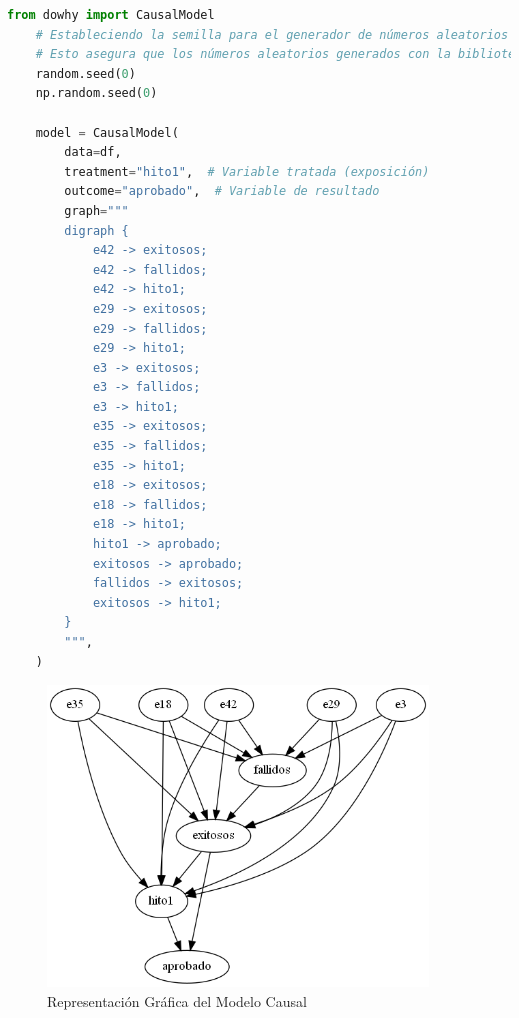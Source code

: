 \begin{lstlisting}[language=Python, caption=Construcción del Modelo Causal para hito1, label=lst:model_causalHito1]
    from dowhy import CausalModel
    # Estableciendo la semilla para el generador de números aleatorios de la biblioteca 'random' en Python.
    # Esto asegura que los números aleatorios generados con la biblioteca 'random' serán reproducibles en cada ejecución.
    random.seed(0)
    np.random.seed(0)
    
    model = CausalModel(
        data=df,
        treatment="hito1",  # Variable tratada (exposición)
        outcome="aprobado",  # Variable de resultado
        graph="""
        digraph {
            e42 -> exitosos;
            e42 -> fallidos;
            e42 -> hito1;
            e29 -> exitosos;
            e29 -> fallidos;
            e29 -> hito1;
            e3 -> exitosos;
            e3 -> fallidos;
            e3 -> hito1;
            e35 -> exitosos;
            e35 -> fallidos;
            e35 -> hito1;
            e18 -> exitosos;
            e18 -> fallidos;
            e18 -> hito1;
            hito1 -> aprobado;
            exitosos -> aprobado;
            fallidos -> exitosos;
            exitosos -> hito1;
        }
        """,
    )
\end{lstlisting}


\begin{figure}[H]
        \centering
        \includegraphics[width=0.9\textwidth]{img/causalidad/graph_causal_model_hito1.png}
        \caption{Representación Gráfica del Modelo Causal}
        \label{fig:modelo_causal_hito1}

\end{figure}

